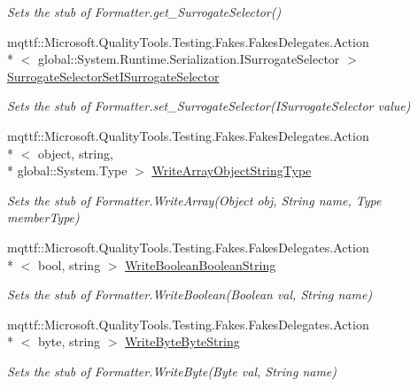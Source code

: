 \begin{DoxyCompactItemize}
\begin{DoxyCompactList}\small\item\em Sets the stub of Formatter.\-get\-\_\-\-Surrogate\-Selector()\end{DoxyCompactList}\item 
mqttf\-::\-Microsoft.\-Quality\-Tools.\-Testing.\-Fakes.\-Fakes\-Delegates.\-Action\\*
$<$ global\-::\-System.\-Runtime.\-Serialization.\-I\-Surrogate\-Selector $>$ \hyperlink{class_system_1_1_runtime_1_1_serialization_1_1_fakes_1_1_stub_formatter_afff8ca9d8e009291acdae2c9af65cd5a}{Surrogate\-Selector\-Set\-I\-Surrogate\-Selector}
\begin{DoxyCompactList}\small\item\em Sets the stub of Formatter.\-set\-\_\-\-Surrogate\-Selector(\-I\-Surrogate\-Selector value)\end{DoxyCompactList}\item 
mqttf\-::\-Microsoft.\-Quality\-Tools.\-Testing.\-Fakes.\-Fakes\-Delegates.\-Action\\*
$<$ object, string, \\*
global\-::\-System.\-Type $>$ \hyperlink{class_system_1_1_runtime_1_1_serialization_1_1_fakes_1_1_stub_formatter_a3c6918a6ce3cfca9c7e43ae75e4fe690}{Write\-Array\-Object\-String\-Type}
\begin{DoxyCompactList}\small\item\em Sets the stub of Formatter.\-Write\-Array(\-Object obj, String name, Type member\-Type)\end{DoxyCompactList}\item 
mqttf\-::\-Microsoft.\-Quality\-Tools.\-Testing.\-Fakes.\-Fakes\-Delegates.\-Action\\*
$<$ bool, string $>$ \hyperlink{class_system_1_1_runtime_1_1_serialization_1_1_fakes_1_1_stub_formatter_a35da7f8977b95f1f8a3556891333e4c7}{Write\-Boolean\-Boolean\-String}
\begin{DoxyCompactList}\small\item\em Sets the stub of Formatter.\-Write\-Boolean(\-Boolean val, String name)\end{DoxyCompactList}\item 
mqttf\-::\-Microsoft.\-Quality\-Tools.\-Testing.\-Fakes.\-Fakes\-Delegates.\-Action\\*
$<$ byte, string $>$ \hyperlink{class_system_1_1_runtime_1_1_serialization_1_1_fakes_1_1_stub_formatter_a83132922f90234edf923d43175312ccc}{Write\-Byte\-Byte\-String}
\begin{DoxyCompactList}\small\item\em Sets the stub of Formatter.\-Write\-Byte(\-Byte val, String name)\end{DoxyCompactList}\item 

\end{DoxyCompactItemize}
